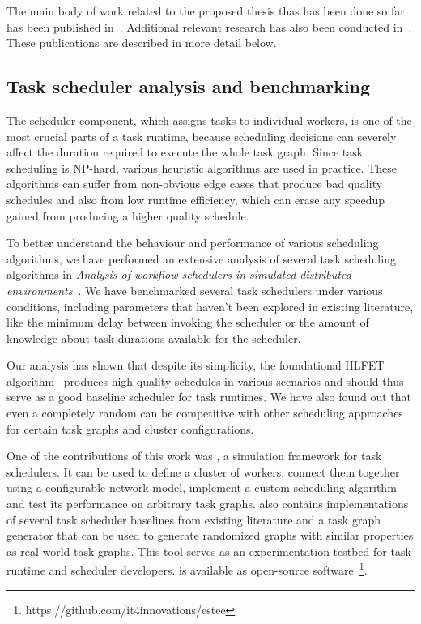 The main body of work related to the proposed thesis thas has been done so far has been published
in~\cite{estee, rsds}. Additional relevant research has also been conducted
in~\cite{spin2,spin}. These publications are described in more detail below.

\subsection{Task scheduler analysis and benchmarking}
The scheduler component, which assigns tasks to individual workers, is one of the
most crucial parts of a task runtime, because scheduling decisions can severely affect the
duration required to execute the whole task graph. Since task scheduling is NP-hard, various
heuristic algorithms are used in practice. These algorithms can suffer from non-obvious edge cases
that produce bad quality schedules and also from low runtime efficiency, which can erase any
speedup gained from producing a higher quality schedule.

To better understand the behaviour and performance of various scheduling algorithms, we have
performed an extensive analysis of several task scheduling algorithms in
\emph{Analysis of workflow schedulers in simulated distributed environments}~\cite{estee}.
We have benchmarked several task schedulers under various conditions, including parameters that
haven't been explored in existing literature, like the minimum delay between invoking the scheduler
or the amount of knowledge about task durations available for the scheduler.

Our analysis has shown that despite its simplicity, the foundational HLFET
algorithm~\cite{hlfet1974} produces high quality schedules in various scenarios and should thus
serve as a good baseline scheduler for task runtimes. We have also found out that even a
completely random can be competitive with other scheduling approaches for certain task graphs
and cluster configurations.

One of the contributions of this work was \estee{}, a simulation framework for task
schedulers. It can be used to define a cluster of workers, connect them together using a
configurable network model, implement a custom scheduling algorithm and test its performance on
arbitrary task graphs. \estee{} also contains implementations of several task scheduler
baselines from existing literature and a task graph generator that can be used to generate
randomized graphs with similar properties as real-world task graphs. This tool serves as an
experimentation testbed for task runtime and scheduler developers. \estee{} is
available as open-source software~\footnote{https://github.com/it4innovations/estee}.

